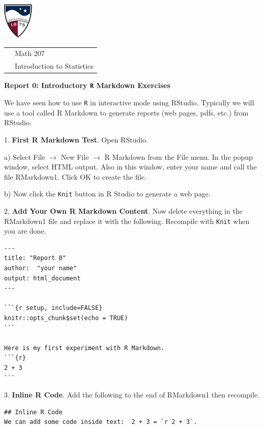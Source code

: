 \documentclass[10pt]{article}
\begin{document}
\pagestyle{empty}
\lstset{language=R, showspaces=false, showstringspaces=false}

\href{http://www.su.edu}{\includegraphics[height=1.75cm]{sulogo.eps}}
\vspace{-1.69cm}

{\small \hfill
\begin{tabular}{cl}
& Math 207\\& Introduction to Statistics\\
\end{tabular}
}
\setlength{\baselineskip}{1.05\baselineskip}
\medskip

\begin{center}
\textbf{\large  Report 0: Introductory \texttt{R} Markdown Exercises}
\end{center}

We have seen how to use \texttt{R} in interactive mode using RStudio.  Typically
we will use a tool called R Markdown to generate reports (web pages, pdfs, etc.)
from RStudio.
\medskip

1. \textbf{First R Markdown Test}. Open  RStudio.

\hspace{10pt} a) Select File $\to$ New File $\to$ R Markdown from the File menu.
In the popup window, select HTML output.  Also in this window, enter your name and
call the file RMarkdown1.  Click OK to create the file.

\hspace{10pt} b) Now click the \texttt{Knit} button in R Studio to generate a web page.
\medskip

2. \textbf{Add Your Own R Markdown Content}.
Now delete everything in the RMarkdown1 file and replace it
with the following. Recompile with \texttt{Knit} when you are done. \vspace{-10pt}
\begin{verbatim}
---
title: "Report 0"
author:  "your name"
output: html_document
---

```{r setup, include=FALSE}
knitr::opts_chunk$set(echo = TRUE)
```

Here is my first experiment with R Markdown.
```{r}
2 + 3
```
\end{verbatim}

3. \textbf{Inline R Code}.
Add the following to the end of RMarkdown1 then recompile.\vspace{-10pt}
\begin{verbatim}
## Inline R Code
We can add some code inside text:  2 + 3 = `r 2 + 3`.
\end{verbatim}
\end{document}
